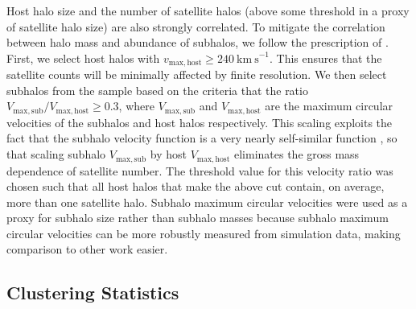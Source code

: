 \documentclass[usenatbib,usegraphicx,letterpaper]{mn2e}
\begin{document}


Host halo size and the number of satellite halos 
(above some threshold in a proxy of satellite halo size) are also strongly correlated. 
To mitigate the correlation between halo mass and abundance of subhalos, 
we follow the prescription of \citet{wechsler06}. First, we select host halos 
with $v_{\mathrm{max,host}} \ge 240 \ \mathrm{km \ s}^{-1}$. This ensures that the satellite counts 
will be minimally affected by finite resolution. We then select subhalos
from the sample based on the criteria that the ratio $V_{\mathrm{max,sub}}/V_{\mathrm{max,host}} \ge 0.3$, 
where $V_{\mathrm{max,sub}}$ and $V_{\mathrm{max,host}}$ are the maximum circular velocities 
of the subhalos and host halos respectively. This scaling exploits the fact that the subhalo velocity 
function is a very nearly self-similar function \citep[e.g.,][and references therein]{zentner05}, 
so that scaling subhalo $V_{\mathrm{max,sub}}$ by host $V_{\mathrm{max,host}}$ 
eliminates the gross mass dependence of satellite number. The threshold value for this velocity ratio was chosen 
such that all host halos that make the above cut contain, on average, more than one satellite halo. 
Subhalo maximum circular velocities were used as a proxy for subhalo size rather than subhalo masses because 
subhalo maximum circular velocities can be more robustly measured from simulation data, making 
comparison to other work easier.


\subsection{Clustering Statistics}
\end{document}
